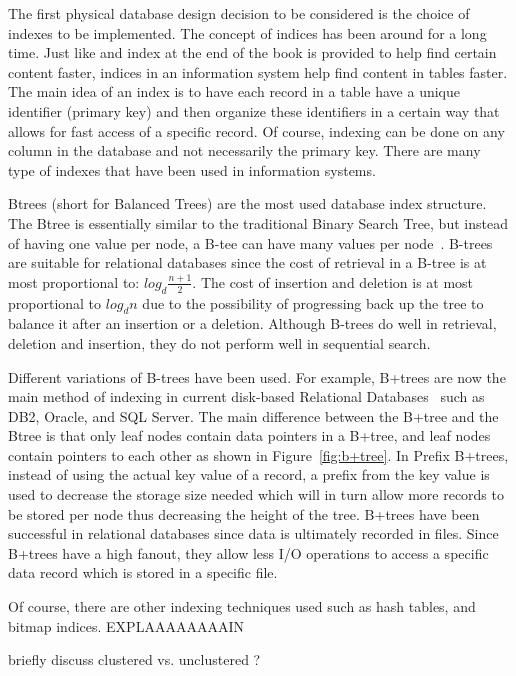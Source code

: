 \documentclass[12pt,a4paper]{article}
\begin{document}
The first physical database design decision to be considered is the choice of indexes to be implemented. The concept of indices has been around for a long time.
Just like and index at the end of the book is provided to help find certain content faster, indices in an information system help find content in tables faster.
The main idea of an index is to have each record in a table have a unique identifier (primary key) and then organize these identifiers in a certain way that
allows for fast access of a specific record. Of course, indexing can be done on any column in the database and not necessarily the primary key. There are many
type of indexes that have been used in information systems.

Btrees (short for Balanced Trees) are the most used database index structure.  The Btree is essentially similar to the traditional Binary Search Tree, but
instead of having one value per node, a B-tee can have many values per node~\cite{comer1979ubiquitous}. B-trees are suitable for relational databases since the
cost of retrieval in a B-tree is at most proportional to: $log_{d}\frac{n+1}{2}$. The cost of insertion
and deletion is at most proportional to $log_{d}n$ due to the possibility of progressing back up the tree to balance it after an insertion or a deletion.
Although B-trees do well in retrieval, deletion and insertion, they do not perform well in sequential search. 


Different variations of B-trees have been used. For example, B+trees are now the main method of indexing in current disk-based Relational
Databases~\cite{lightstone2007physical} such as DB2, Oracle, and SQL Server. The main difference between the
B+tree and the Btree is that only leaf nodes contain data pointers in a B+tree, and leaf nodes contain pointers to each other as shown in
Figure~\ref{fig:b+tree}. In Prefix B+trees, instead of using the
actual key value of a record, a prefix from the key value is used to decrease the storage size needed which will in turn allow more records to be stored per
node thus decreasing the height of the tree. B+trees have been successful in relational databases since data is ultimately recorded in files. Since B+trees have
a high fanout, they allow less I/O operations to access a specific data record which is stored in a specific file.

Of course, there are other indexing techniques used such as hash tables, and bitmap indices. EXPLAAAAAAAAIN

briefly discuss clustered vs. unclustered ?
\end{document}
